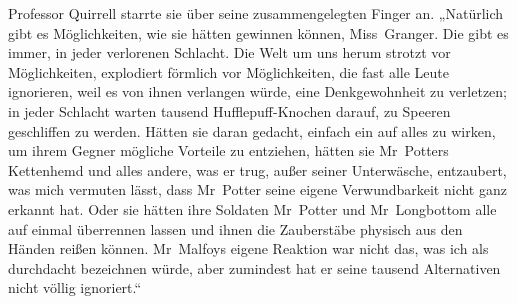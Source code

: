 Professor Quirrell starrte sie über seine zusammengelegten Finger an.
„Natürlich gibt es Möglichkeiten, wie sie hätten gewinnen können, Miss~Granger. Die gibt es immer, in jeder verlorenen Schlacht. Die Welt um uns herum strotzt vor Möglichkeiten, explodiert förmlich vor Möglichkeiten, die fast alle Leute ignorieren, weil es von ihnen verlangen würde, eine Denkgewohnheit zu verletzen; in jeder Schlacht warten tausend Hufflepuff-Knochen darauf, zu Speeren geschliffen zu werden. Hätten sie daran gedacht, einfach ein  auf alles zu wirken, um ihrem Gegner mögliche Vorteile zu entziehen, hätten sie Mr~Potters Kettenhemd und alles andere, was er trug, außer seiner Unterwäsche, entzaubert, was mich vermuten lässt, dass Mr~Potter seine eigene Verwundbarkeit nicht ganz erkannt hat. Oder sie hätten ihre Soldaten Mr~Potter und Mr~Longbottom alle auf einmal überrennen lassen und ihnen die Zauberstäbe physisch aus den Händen reißen können. Mr~Malfoys eigene Reaktion war nicht das, was ich als durchdacht bezeichnen würde, aber zumindest hat er seine tausend Alternativen nicht völlig ignoriert.“
